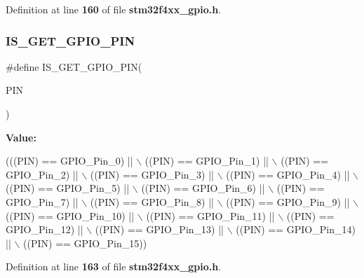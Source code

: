 Definition at line \textbf{ 160} of file \textbf{ stm32f4xx\+\_\+gpio.\+h}.

\mbox{\label{group__GPIO__pins__define_gaddf7154b7f30b7c0a70f3aeaff5ddffc}} 
\subsubsection{I\+S\+\_\+\+G\+E\+T\+\_\+\+G\+P\+I\+O\+\_\+\+P\+IN}
{\footnotesize\ttfamily \#define I\+S\+\_\+\+G\+E\+T\+\_\+\+G\+P\+I\+O\+\_\+\+P\+IN(\begin{DoxyParamCaption}\item[{}]{P\+IN }\end{DoxyParamCaption})}

{\bfseries Value\+:}
\begin{DoxyCode}
(((PIN) == GPIO_Pin_0) || \(\backslash\)
                              ((PIN) == GPIO_Pin_1) || \(\backslash\)
                              ((PIN) == GPIO_Pin_2) || \(\backslash\)
                              ((PIN) == GPIO_Pin_3) || \(\backslash\)
                              ((PIN) == GPIO_Pin_4) || \(\backslash\)
                              ((PIN) == GPIO_Pin_5) || \(\backslash\)
                              ((PIN) == GPIO_Pin_6) || \(\backslash\)
                              ((PIN) == GPIO_Pin_7) || \(\backslash\)
                              ((PIN) == GPIO_Pin_8) || \(\backslash\)
                              ((PIN) == GPIO_Pin_9) || \(\backslash\)
                              ((PIN) == GPIO_Pin_10) || \(\backslash\)
                              ((PIN) == GPIO_Pin_11) || \(\backslash\)
                              ((PIN) == GPIO_Pin_12) || \(\backslash\)
                              ((PIN) == GPIO_Pin_13) || \(\backslash\)
                              ((PIN) == GPIO_Pin_14) || \(\backslash\)
                              ((PIN) == GPIO_Pin_15))
\end{DoxyCode}


Definition at line \textbf{ 163} of file \textbf{ stm32f4xx\+\_\+gpio.\+h}.

\mbox{\label{group__GPIO__pins__define_gad6ec74e33360395535ad5d91ba6d4781}} 
